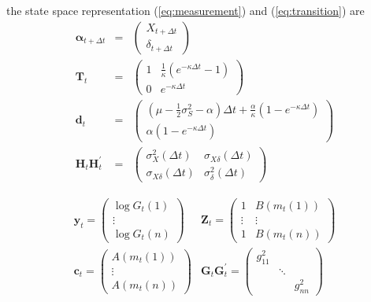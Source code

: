 \documentclass[a4paper,11pt]{article}
\newcommand{\sigmaS}{\sigma_S}
\begin{document}
the state space representation (\ref{eq:measurement}) and
(\ref{eq:transition}) are
\begin{eqnarray}
  \boldsymbol{\alpha}_{t+\Delta t}&=&\begin{pmatrix}X_{t+\Delta t}\\\delta_{t+\Delta t}\end{pmatrix}\\
  \mathbf{T}_t &=&
  \begin{pmatrix}
    1 & \frac{1}{\kappa}\left(e^{-\kappa
        \Delta t} - 1\right)\\
    0 & e^{-\kappa \Delta t}
  \end{pmatrix}\\
  \mathbf{d}_t &=&
  \begin{pmatrix}
    \left(\mu - \frac{1}{2} \sigmaS^2 - \alpha \right) \Delta t + \frac{\alpha}{\kappa} \left(1 - e^{-\kappa \Delta t}\right)\\
    \alpha \left(1 - e^{-\kappa \Delta t}\right)
  \end{pmatrix}\\
  \mathbf{H}_t\mathbf{H}^{'}_t &=&
  \begin{pmatrix}
    \sigma_X^2(\Delta{t}) & \sigma_{X \delta}(\Delta{t}) \\
    \sigma_{X \delta}(\Delta{t}) & \sigma_\delta^2(\Delta{t})
  \end{pmatrix}
\end{eqnarray}

\begin{eqnarray}
  \mathbf{y}_t =
  \begin{pmatrix}
    \log{G_t(1)}\\
    \vdots\\
    \log{G_t(n)}
  \end{pmatrix}
  & \mathbf{Z}_t =
  \begin{pmatrix}
    1 & B(m_t(1))\\
    \vdots & \vdots\\
    1 & B(m_t(n))
  \end{pmatrix}\\
  \mathbf{c}_t =
  \begin{pmatrix}
    A(m_t(1))\\
    \vdots \\
    A(m_t(n))
  \end{pmatrix}
  & \mathbf{G}_t\mathbf{G}^{'}_t =
  \begin{pmatrix}
    g_{11}^2&&\\
    &\ddots&\\
    &&g_{nn}^2
  \end{pmatrix}
\end{eqnarray}
\end{document}
